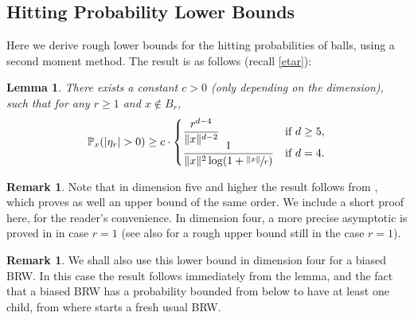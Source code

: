 \documentclass[JEP,XML,SOM,Unicode,NoFloatCountersInSection,published]{cedram}
\theoremstyle{plain}
\newtheorem{lemma}[theorem]{Lemma}
\theoremstyle{definition}
\newtheorem{remark}[theorem]{Remark}
\newcommand{\1}{{\text{\Large $\mathfrak 1$}}}
\begin{document}
\subsection{Hitting Probability Lower Bounds}\label{sec.hitting}
Here we derive rough lower bounds for the hitting probabilities of balls, using a second moment method. The result is as follows (recall \eqref{etar}):

\begin{lemma}\label{lem.hitting}
There exists a constant $c>0$ (only depending on the dimension),
such that for any $r\ge 1$ and $x\notin B_r$,\vspace*{-3pt}\enlargethispage{\baselineskip}
\begin{equation*}
\mathbb P_x(|\eta_r|>0) \ge c\cdot
\begin{cases}
\dfrac{r^{d-4}}{\|x\|^{d-2}} & \text{if }d\ge 5, \\[-3pt]
\dfrac 1{\|x\|^2\log (1+\sfrac{\|x\|}{r}) }& \text{if }d=4.
\end{cases}
\end{equation*}
\end{lemma}

\begin{remark}
Note that in dimension five and higher the result follows from \cite{Zhu1}, which proves as well an upper bound of the same order.
We include a short proof here, for the reader's convenience.
In dimension four, a more precise asymptotic is proved in
\cite{Zhu3} in case $r=1$ (see also \cite{Zhu4} for a rough upper bound still in the case $r=1$).
\end{remark}

\begin{remark} \label{rem.lb.biased}
We shall also use this lower bound in dimension four for a biased BRW. In this case the result follows immediately from the lemma, and the fact that a biased BRW has a probability bounded from below to have at least one child, from where starts a fresh usual BRW.
\end{remark}
\end{document}
